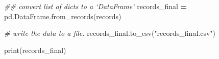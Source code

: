 \documentclass[]{book}
\newenvironment{Shaded}{\begin{snugshade}}{\end{snugshade}}
\newcommand{\BuiltInTok}[1]{#1}
\newcommand{\CommentTok}[1]{\textcolor[rgb]{0.56,0.35,0.01}{\textit{#1}}}
\newcommand{\NormalTok}[1]{#1}
\newcommand{\OperatorTok}[1]{\textcolor[rgb]{0.81,0.36,0.00}{\textbf{#1}}}
\newcommand{\StringTok}[1]{\textcolor[rgb]{0.31,0.60,0.02}{#1}}
\begin{document}
\begin{Shaded}
\begin{Highlighting}[]
\CommentTok{## convert list of dicts to a `DataFrame`}
\NormalTok{records_final }\OperatorTok{=}\NormalTok{ pd.DataFrame.from_records(records)}
\end{Highlighting}
\end{Shaded}

\begin{Shaded}
\begin{Highlighting}[]
\CommentTok{# write the data to a file.}
\NormalTok{records_final.to_csv(}\StringTok{"records_final.csv"}\NormalTok{)}
\end{Highlighting}
\end{Shaded}

\begin{Shaded}
\begin{Highlighting}[]
\BuiltInTok{print}\NormalTok{(records_final)}
\end{Highlighting}
\end{Shaded}
\end{document}
